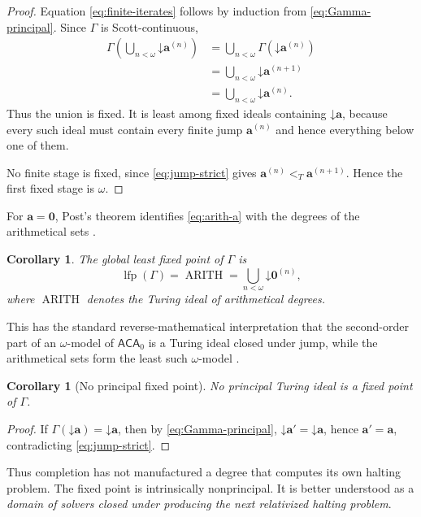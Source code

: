 \documentclass[11pt]{article}
\newtheorem{corollary}[theorem]{Corollary}
\theoremstyle{definition}
\theoremstyle{remark}
\newcommand{\Arith}{\operatorname{ARITH}}
\newcommand{\lfp}{\operatorname{lfp}}
\newcommand{\down}{\mathord{\downarrow}}
\newcommand{\ltT}{<_T}
\begin{document}
\begin{proof}
Equation \eqref{eq:finite-iterates} follows by induction from \eqref{eq:Gamma-principal}. Since $\Gamma$ is Scott-continuous,
\begin{align*}
\Gamma\!\left(\bigcup_{n<\omega}\down\mathbf a^{(n)}\right)
&=
\bigcup_{n<\omega}\Gamma(\down\mathbf a^{(n)})\\
&=
\bigcup_{n<\omega}\down\mathbf a^{(n+1)}\\
&=
\bigcup_{n<\omega}\down\mathbf a^{(n)}.
\end{align*}
Thus the union is fixed. It is least among fixed ideals containing $\down\mathbf a$, because every such ideal must contain every finite jump $\mathbf a^{(n)}$ and hence everything below one of them.

No finite stage is fixed, since \eqref{eq:jump-strict} gives
$\mathbf a^{(n)}\ltT\mathbf a^{(n+1)}$. Hence the first fixed stage is $\omega$.
\end{proof}

For $\mathbf a=\mathbf0$, Post's theorem identifies \eqref{eq:arith-a} with the degrees of the arithmetical sets \cite{Post1944}.

\begin{corollary}
\label{cor:arith-lfp}
The global least fixed point of $\Gamma$ is
\[
\lfp(\Gamma)
=
\Arith
=
\bigcup_{n<\omega}\down\mathbf0^{(n)},
\]
where $\Arith$ denotes the Turing ideal of arithmetical degrees.
\end{corollary}

This has the standard reverse-mathematical interpretation that the second-order part of an $\omega$-model of $\mathsf{ACA}_0$ is a Turing ideal closed under jump, while the arithmetical sets form the least such $\omega$-model \cite{Simpson2009}.

\begin{corollary}[No principal fixed point]
\label{cor:no-principal}
No principal Turing ideal is a fixed point of $\Gamma$.
\end{corollary}

\begin{proof}
If $\Gamma(\down\mathbf a)=\down\mathbf a$, then by \eqref{eq:Gamma-principal},
$\down\mathbf a'=\down\mathbf a$, hence $\mathbf a'=\mathbf a$, contradicting \eqref{eq:jump-strict}.
\end{proof}

Thus completion has not manufactured a degree that computes its own halting problem. The fixed point is intrinsically nonprincipal. It is better understood as a \emph{domain of solvers closed under producing the next relativized halting problem}.
\end{document}
